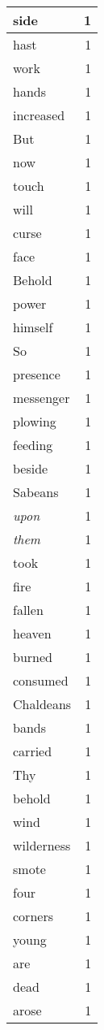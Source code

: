 \begin{center}
\begin{longtable}{l|r}
side & 1\\ \hline 
hast & 1\\ \hline 
work & 1\\ \hline 
hands & 1\\ \hline 
increased & 1\\ \hline 
But & 1\\ \hline 
now & 1\\ \hline 
touch & 1\\ \hline 
will & 1\\ \hline 
curse & 1\\ \hline 
face & 1\\ \hline 
Behold & 1\\ \hline 
power & 1\\ \hline 
himself & 1\\ \hline 
So & 1\\ \hline 
presence & 1\\ \hline 
messenger & 1\\ \hline 
plowing & 1\\ \hline 
feeding & 1\\ \hline 
beside & 1\\ \hline 
Sabeans & 1\\ \hline 
\emph{upon} & 1\\ \hline 
\emph{them} & 1\\ \hline 
took & 1\\ \hline 
fire & 1\\ \hline 
fallen & 1\\ \hline 
heaven & 1\\ \hline 
burned & 1\\ \hline 
consumed & 1\\ \hline 
Chaldeans & 1\\ \hline 
bands & 1\\ \hline 
carried & 1\\ \hline 
Thy & 1\\ \hline 
behold & 1\\ \hline 
wind & 1\\ \hline 
wilderness & 1\\ \hline 
smote & 1\\ \hline 
four & 1\\ \hline 
corners & 1\\ \hline 
young & 1\\ \hline 
are & 1\\ \hline 
dead & 1\\ \hline 
arose & 1\\ \hline 

\end{longtable}
\end{center}
